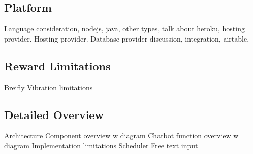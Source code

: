 \subsection{Platform}

Language consideration, nodejs, java, other types, talk about heroku, hosting provider. Hosting provider.
Database provider discussion, integration, airtable,

\subsection{Reward Limitations}
Breifly Vibration limitations

\subsection{Detailed Overview}

Architecture Component overview w diagram
Chatbot function overview w diagram
Implementation limitations
Scheduler
Free text input

\newpage
